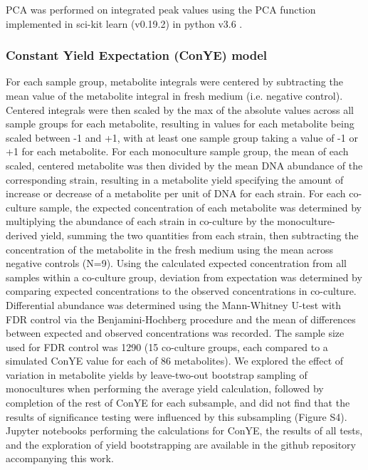 \documentclass[11pt,twocolumn,notitlepage,openany,twoside]{book}
\begin{document}
\begin{refsection}
PCA was performed on integrated peak values using the PCA function implemented in sci-kit learn (v0.19.2) in python v3.6 \cite{Pedregosa2011-wa}.

\subsubsection{Constant Yield Expectation (ConYE) model}

For each sample group, metabolite integrals were centered by subtracting the mean value of the metabolite integral in fresh medium (i.e. negative control). Centered integrals were then scaled by the max of the absolute values across all sample groups for each metabolite, resulting in values for each metabolite being scaled between -1 and +1, with at least one sample group taking a value of -1 or +1 for each metabolite. For each monoculture sample group, the mean of each scaled, centered metabolite was then divided by the mean DNA abundance of the corresponding strain, resulting in a metabolite yield specifying the amount of increase or decrease of a metabolite per unit of DNA for each strain. For each co-culture sample, the expected concentration of each metabolite was determined by multiplying the abundance of each strain in co-culture by the monoculture-derived yield, summing the two quantities from each strain, then subtracting the concentration of the metabolite in the fresh medium using the mean across negative controls (N=9). Using the calculated expected concentration from all samples within a co-culture group, deviation from expectation was determined by comparing expected concentrations to the observed concentrations in co-culture. Differential abundance was determined using the Mann-Whitney U-test with FDR control via the Benjamini-Hochberg procedure \cite{Benjamini1995-nd} and the mean of differences between expected and observed concentrations was recorded. The sample size used for FDR control was 1290 (15 co-culture groups, each compared to a simulated ConYE value for each of 86 metabolites). We explored the effect of variation in metabolite yields by leave-two-out bootstrap sampling of monocultures when performing the average yield calculation, followed by completion of the rest of ConYE for each subsample, and did not find that the results of significance testing were influenced by this subsampling (Figure S4). Jupyter notebooks performing the calculations for ConYE, the results of all tests, and the exploration of yield bootstrapping are available in the github repository accompanying this work.


\end{refsection}
\end{document}
